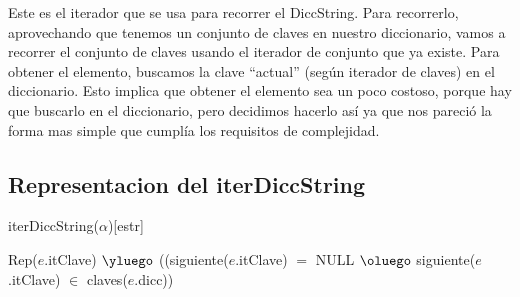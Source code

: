 \begin{Representacion}

Este es el iterador que se usa para recorrer el DiccString. Para recorrerlo, aprovechando que tenemos un conjunto de claves en nuestro diccionario, vamos a recorrer el conjunto de claves usando el iterador de conjunto que ya existe. Para obtener el elemento, buscamos la clave ``actual'' (seg\'un iterador de claves) en el diccionario. Esto implica que obtener el elemento sea un poco costoso, porque hay que buscarlo en el diccionario, pero decidimos hacerlo as\'i ya que nos pareci\'o la forma mas simple que cumpl\'ia los requisitos de complejidad.

\subsection{Representacion del iterDiccString}
    
  \begin{Estructura}{iterDiccString($\alpha$)}[estr]
    \begin{Tupla}[estr]
    \end{Tupla}
  \end{Estructura}




%
{Rep($e$.itClave) $\yluego$ ((siguiente($e$.itClave) $=$ NULL $\oluego$ siguiente($e$.itClave) $\in$ claves($e$.dicc))}

$ $\newline
$ $\newline



%
%

\end{Representacion}

